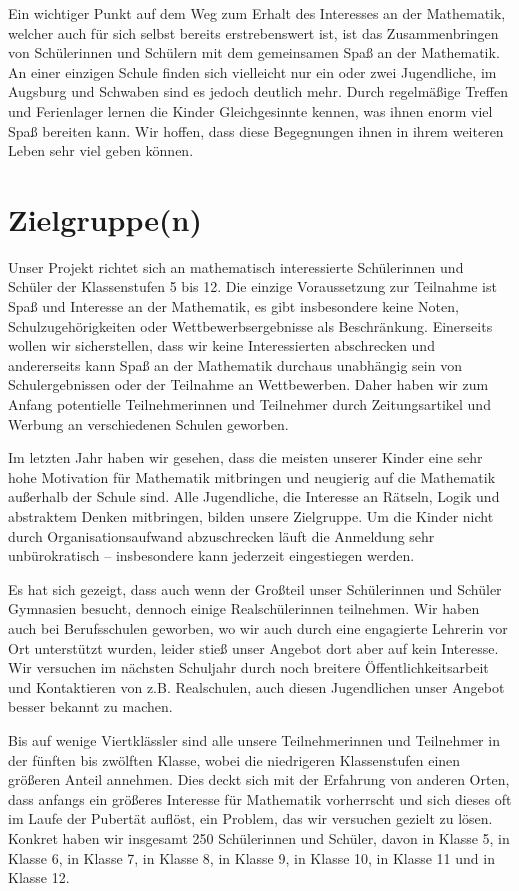 \documentclass[12pt]{zettel}
\begin{document}
Ein wichtiger Punkt auf dem Weg zum Erhalt des Interesses an der
Mathematik, welcher auch für sich selbst bereits erstrebenswert ist, ist
das Zusammenbringen von Schülerinnen und Schülern mit dem gemeinsamen
Spaß an der Mathematik. An einer einzigen Schule finden sich vielleicht
nur ein oder zwei Jugendliche, im Augsburg und Schwaben sind es jedoch
deutlich mehr. Durch regelmäßige Treffen und Ferienlager lernen die
Kinder Gleichgesinnte kennen, was ihnen enorm viel Spaß bereiten kann.
Wir hoffen, dass diese Begegnungen ihnen in ihrem weiteren Leben sehr
viel geben können.


\section{Zielgruppe(n)}

Unser Projekt richtet sich an mathematisch interessierte Schülerinnen
und Schüler der Klassenstufen 5 bis 12. Die einzige Voraussetzung zur
Teilnahme ist Spaß und Interesse an der Mathematik, es gibt insbesondere
keine Noten, Schulzugehörigkeiten oder Wettbewerbsergebnisse als
Beschränkung. Einerseits wollen wir sicherstellen, dass wir keine
Interessierten abschrecken und andererseits kann Spaß an der Mathematik
durchaus unabhängig sein von Schulergebnissen oder der Teilnahme an
Wettbewerben. Daher haben wir zum Anfang potentielle Teilnehmerinnen und
Teilnehmer durch Zeitungsartikel und Werbung an verschiedenen Schulen
geworben.

Im letzten Jahr haben wir gesehen, dass die meisten unserer Kinder eine
sehr hohe Motivation für Mathematik mitbringen und neugierig auf die
Mathematik außerhalb der Schule sind. Alle Jugendliche, die Interesse an
Rätseln, Logik und abstraktem Denken mitbringen, bilden unsere
Zielgruppe. Um die Kinder nicht durch Organisationsaufwand abzuschrecken
läuft die Anmeldung sehr unbürokratisch -- insbesondere kann jederzeit
eingestiegen werden.

Es hat sich gezeigt, dass auch wenn der Großteil unser Schülerinnen und
Schüler Gymnasien besucht, dennoch einige Realschülerinnen teilnehmen.
Wir haben auch bei Berufsschulen geworben, wo wir auch durch eine
engagierte Lehrerin vor Ort unterstützt wurden, leider stieß unser
Angebot dort aber auf kein Interesse. Wir versuchen im nächsten
Schuljahr durch noch breitere Öffentlichkeitsarbeit und Kontaktieren von
z.B. Realschulen, auch diesen Jugendlichen unser Angebot besser bekannt
zu machen.

Bis auf wenige Viertklässler sind alle unsere Teilnehmerinnen und
Teilnehmer in der fünften bis zwölften Klasse, wobei die niedrigeren
Klassenstufen einen größeren Anteil annehmen. Dies deckt sich mit der
Erfahrung von anderen Orten, dass anfangs ein größeres Interesse für
Mathematik vorherrscht und sich dieses oft im Laufe der Pubertät
auflöst, ein Problem, das wir versuchen gezielt zu lösen. Konkret haben
wir insgesamt 250 Schülerinnen und Schüler, davon in Klasse 5, in Klasse
6, in Klasse 7, in Klasse 8, in Klasse 9, in Klasse 10, in Klasse 11 und
in Klasse 12.
\end{document}
